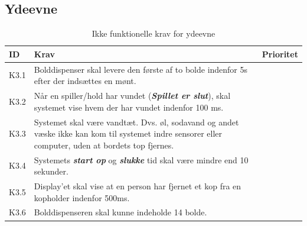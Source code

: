 \documentclass[Kravspecifikation/Kravspec_Main.tex]{subfiles}
\begin{document}
\subsection{Ydeevne}
\begin{table}[H]
\centering
\begin{tabular}{|L{0.1\textwidth}|L{0.65\textwidth}|L{0.15\textwidth}|}
\hline
\textbf{ID} & \textbf{Krav} & \textbf{Prioritet} \\ \hline
K3.1 & Bolddispenser skal levere den første af to bolde indenfor 5s efter der indsættes en mønt. &  \\ \hline
K3.2 & Når en spiller/hold har vundet (\textit{\textbf{Spillet er slut}}), skal systemet vise hvem der har vundet indenfor 100 ms. &  \\ \hline
K3.3 & Systemet skal være vandtæt. Dvs. øl, sodavand og andet væske ikke kan kom til systemet indre sensorer eller computer, uden at bordets top fjernes. &  \\ \hline
K3.4 & Systemets \textbf{\textit{start op}} og \textbf{\textit{slukke}} tid skal være mindre end 10 sekunder. &  \\ \hline
K3.5 & Display'et skal vise at en person har fjernet et kop fra en kopholder indenfor 500ms. &  \\ \hline
K3.6 & Bolddispenseren skal kunne indeholde 14 bolde. & \\ \hline
\end{tabular}
\caption{Ikke funktionelle krav for ydeevne}
\label{tab:ydeevne}
\end{table}
\end{document}
